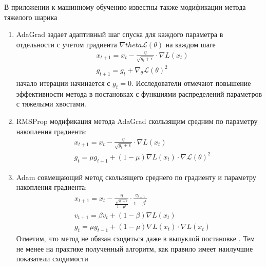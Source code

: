 В приложении к машинному обучению известны также модификации метода тяжелого шарика \begin{enumerate}
    \item AdaGrad \cite{duchi2011adaptive} задает адаптивный шаг спуска для 
    каждого параметра в отдельности с учетом градиента $\nabla theta \mathcal{L}(\theta)$ на каждом шаге
        \begin{equation}
            \begin{aligned}
                &x_{t+1} = x_t - \frac{\eta}{\sqrt{g_t+\epsilon}} \cdot \nabla L(x_t) \\
                &g_{t+1} = g_t + \nabla_\theta \mathcal{L}(\theta)^2
            \end{aligned}
        \end{equation}
    начало итерации начинается с $g_t=0$. Исследователи отмечают повышение эффективности метода в постановках с функциями распределений параметров 
    с тяжелыми хвостами.
    \item RMSProp \cite{krizhevsky2012imagenet} модификация метода
    AdaGrad скользящим средним по параметру накопления градиента:
        \begin{equation}
            \begin{aligned}
                &x_{t+1} = x_t - \frac{\eta}{\sqrt{g_t+\epsilon}} \cdot \nabla L(x_t) \\
                &g_t = \mu g_{t+1} + (1-\mu)\nabla L(x_t) \cdot \nabla \mathcal{L}(\theta)^2
            \end{aligned}
        \end{equation}
    \item Adam \cite{kingma2014adam} совмещающий метод скользящего среднего по градиенту и параметру накопления градиента:
        \begin{equation}
            \begin{aligned}
                &x_{t+1} = x_t - \frac{\eta}{\frac{\sqrt{g_t+\epsilon}}{1-\mu^t}} \cdot \frac{v_{t+1}}{1-\beta^t} \\
                &v_{t+1} = \beta v_t + (1-\beta) \nabla L(x_t) \\
                &g_t = \mu g_{t-1} + (1-\mu)\nabla L(x_t) \cdot \nabla  L(x_t)
            \end{aligned}
        \end{equation}
    Отметим, что метод не обязан сходиться даже в выпуклой постановке \cite{reddi2019convergence}. Тем не менее на практике полученный
    алгоритм, как правило имеет наилучшие показатели сходимости
\end{enumerate}


